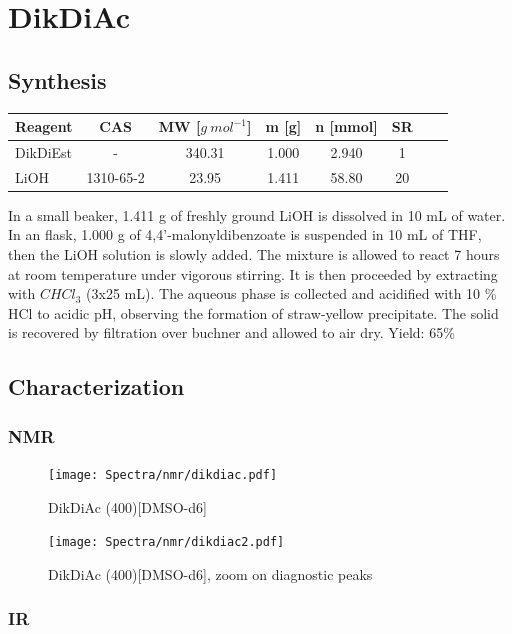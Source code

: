 \documentclass[../Master.tex]{subfiles}
\begin{document}
\newpage
\section{DikDiAc}
\subsection{Synthesis}

\begin{center}
	\begin{tabular}[b]{lccccccc}
		\toprule
		Reagent  & CAS       & MW [\(g \ mol^{-1}\)] & m [g] & n [mmol] & SR \\
		\midrule
		DikDiEst & -         & 340.31                & 1.000 & 2.940    & 1  \\
		LiOH     & 1310-65-2 & 23.95                 & 1.411 & 58.80    & 20 \\
		\bottomrule
	\end{tabular}
\end{center}

In a small beaker, 1.411 g of freshly ground LiOH is dissolved in 10 mL of water. In an flask, 1.000 g of 4,4'-malonyldibenzoate is suspended in 10 mL of THF, then the LiOH solution is slowly added. The mixture is allowed to react 7 hours at room temperature under vigorous stirring. It is then proceeded by extracting with \(CHCl_{3}\) (3x25 mL). The aqueous phase is collected and acidified with 10 \% HCl to acidic pH, observing the formation of straw-yellow precipitate. The solid is recovered by filtration over buchner and allowed to air dry. Yield: 65\%

\newpage
\subsection{Characterization}
\subsubsection{NMR}
\begin{figure}[h!]
	\centering
	\texttt{[image: Spectra/nmr/dikdiac.pdf]}
	\caption{DikDiAc (400)[DMSO-d6]}
\end{figure}
\begin{figure}[h!]
	\centering
	\texttt{[image: Spectra/nmr/dikdiac2.pdf]}
	\caption{DikDiAc (400)[DMSO-d6], zoom on diagnostic peaks}
\end{figure}

\newpage
\subsubsection{IR}
\end{document}
